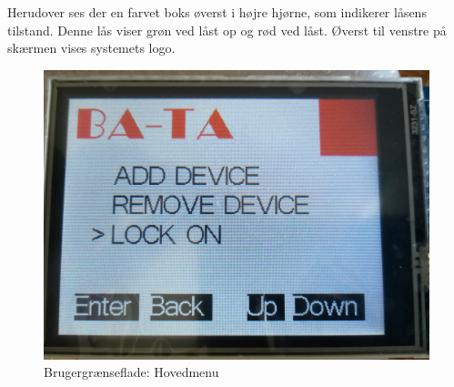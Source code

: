  Herudover ses der en farvet boks øverst i højre hjørne, som indikerer låsens tilstand. Denne lås viser grøn ved låst op og rød ved låst. Øverst til venstre på skærmen vises systemets logo.    
\begin{figure}[H]
	\centering
	\includegraphics[width = 300 pt]{Img/start.jpg}
	\caption{Brugergrænseflade: Hovedmenu}
	\label{fig:start}
\end{figure}

